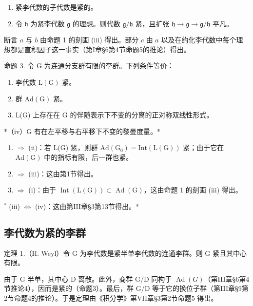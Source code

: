 \begin{enumerate}
\def\labelenumi{\alph{enumi})}
\setcounter{enumi}{1}
\item
  紧李代数的子代数是紧的。
\item
  令 \(\mathfrak{h}\) 为紧李代数 \(\mathfrak{g}\) 的理想。则代数 \(\mathfrak{g} / \mathfrak{h}\) 紧，且扩张 \(\mathfrak{h} \to \mathfrak{g} \to \mathfrak{g} / \mathfrak{h}\) 平凡。
\end{enumerate}

断言 \(a\) 与 \(b\) 由命题 1 的刻画 (iii) 得出。部分 \(c\) 由 \(a\) 以及在约化李代数中每个理想都是直积因子这一事实（第I章§6第4节命题5的推论）得出。

命题 3. 令 G 为连通分支群有限的李群。下列条件等价：

\begin{enumerate}
\def\labelenumi{(\roman{enumi})}
\item
  李代数 \(\mathrm{L}(\mathrm{G})\) 紧。
\item
  群 \(\mathrm{Ad}(\mathrm{G})\) 紧。
\item
  L(G) 上存在在 G 的伴随表示下不变的分离的正对称双线性形式。
\end{enumerate}

*（iv）G 有在左平移与右平移下不变的黎曼度量。*

\begin{enumerate}
\def\labelenumi{(\roman{enumi})}
\item
  \(\Longrightarrow\) (ii)：若 L(G) 紧，则群 \(\mathrm{Ad}(\mathrm{G}_{0}) = \mathrm{Int}(\mathrm{L}(\mathrm{G}))\) 紧；由于它在 \(\mathrm{Ad}(\mathrm{G})\) 中的指标有限，后一群也紧。
\item
  \(\Longrightarrow\) (iii)：这由第1节得出。
\item
  \(\Longrightarrow\) (i)：由于 \(\operatorname{Int}(\mathrm{L}(\mathrm{G})) \subset \operatorname{Ad}(\mathrm{G})\)，这由命题 1 的刻画 (iii) 得出。
\end{enumerate}

\(^{*}\) (iii) \(\Longleftrightarrow\) (iv)：这由第III章§3第13节得出。*

\subsection{李代数为紧的李群}

定理 1.（H. Weyl）令 G 为李代数是紧半单李代数的连通李群。则 G 紧且其中心有限。

由于 G 半单，其中心 D 离散。此外，商群 G/D 同构于 \(\operatorname{Ad}(G)\)（第III章§6第4节推论4），因而是紧的（命题3）。最后，群 G/D 等于它的换位子群（第III章§9第2节命题4的推论）。于是定理由《积分学》第VII章§3第2节命题5 得出。

